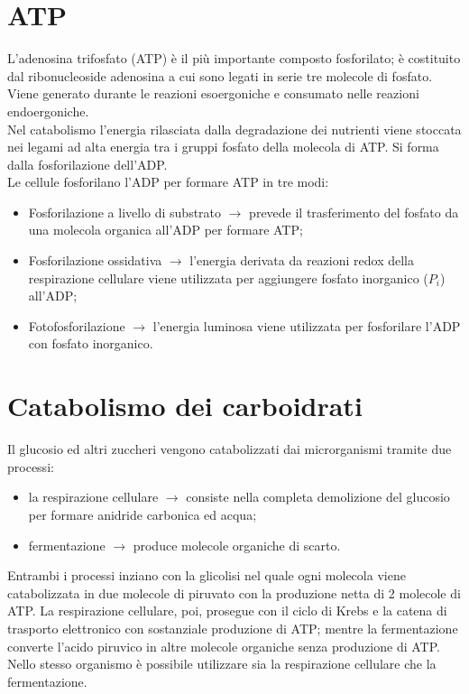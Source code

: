 \section{ATP}
L'adenosina trifosfato (ATP) \`e il pi\`u importante composto fosforilato; \`e costituito dal ribonucleoside adenosina a cui sono legati in serie tre molecole di fosfato. Viene generato durante le reazioni esoergoniche e consumato nelle reazioni endoergoniche. 
\\Nel catabolismo l'energia rilasciata dalla degradazione dei nutrienti viene stoccata nei legami ad alta energia tra i gruppi fosfato della molecola di ATP. Si forma dalla fosforilazione dell'ADP.
\\Le cellule fosforilano l'ADP per formare ATP in tre modi:
\begin{itemize}
    \item Fosforilazione a livello di substrato $\xrightarrow{}$ prevede il trasferimento del fosfato da una molecola organica all'ADP per formare ATP;
    \item Fosforilazione ossidativa $\xrightarrow{}$ l'energia derivata da reazioni redox della respirazione cellulare viene utilizzata per aggiungere fosfato inorganico ($P_i$) all'ADP; \item Fotofosforilazione $\xrightarrow{}$ l'energia luminosa viene utilizzata per fosforilare l'ADP con fosfato inorganico.
\end{itemize}
\section {Catabolismo dei carboidrati}
Il glucosio ed altri zuccheri vengono catabolizzati dai microrganismi tramite due processi: 
\begin{itemize}
    \item la respirazione cellulare $\xrightarrow{}$ consiste nella completa demolizione del glucosio per formare anidride carbonica ed acqua;
    \item fermentazione $\xrightarrow{}$ produce molecole organiche di scarto.
\end{itemize}
Entrambi i processi inziano con la glicolisi nel quale ogni molecola viene catabolizzata in due molecole di piruvato con la produzione netta di 2 molecole di ATP. La respirazione cellulare, poi, prosegue con il ciclo di Krebs e la catena di trasporto elettronico con sostanziale produzione di ATP; mentre la fermentazione converte l'acido piruvico in altre molecole organiche senza produzione di ATP. Nello stesso organismo \`e possibile utilizzare sia la respirazione cellulare che la fermentazione.
